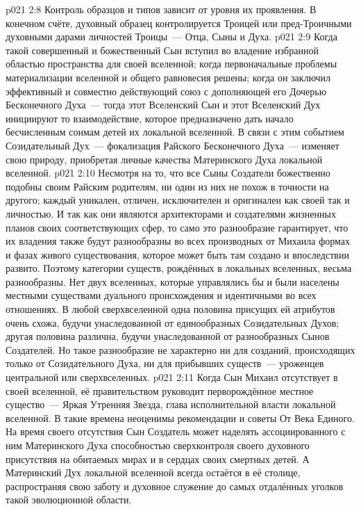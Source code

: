 \vs p021 2:8 \pc Контроль образцов и типов  зависит от уровня их проявления. В конечном счёте, духовный образец контролируется Троицей или пред\hyp{}Троичными духовными дарами личностей Троицы~--- Отца, Сыны и Духа.
\vs p021 2:9 \pc Когда такой совершенный и божественный Сын вступил во владение избранной областью пространства для своей вселенной; когда первоначальные проблемы материализации вселенной и общего равновесия решены; когда он заключил эффективный и совместно действующий союз с дополняющей его Дочерью Бесконечного Духа~--- тогда этот Вселенский Сын и этот Вселенский Дух инициируют то взаимодействие, которое предназначено дать начало бесчисленным сонмам детей их локальной вселенной. В связи с этим событием Созидательный Дух~--- фокализация Райского Бесконечного Духа~--- изменяет свою природу, приобретая личные качества Материнского Духа локальной вселенной.
\vs p021 2:10 Несмотря на то, что все Сыны Создатели божественно подобны своим Райским родителям, ни один из них не похож в точности на другого; каждый уникален, отличен, исключителен и оригинален как своей  так и личностью. И так как они являются архитекторами и создателями жизненных планов своих соответствующих сфер, то само это разнообразие гарантирует, что их владения также будут разнообразны во всех производных от Михаила формах и фазах живого существования, которое может быть там создано и впоследствии развито. Поэтому категории существ, рождённых в локальных вселенных, весьма разнообразны. Нет двух вселенных, которые управлялись бы и были населены местными существами дуального происхождения и идентичными во всех отношениях. В любой сверхвселенной одна половина присущих ей атрибутов очень схожа, будучи унаследованной от единообразных Созидательных Духов; другая половина различна, будучи унаследованной от разнообразных Сынов Создателей. Но такое разнообразие не характерно ни для созданий, происходящих только от Созидательного Духа, ни для прибывших существ~--- уроженцев центральной или сверхвселенных.
\vs p021 2:11 \pc Когда Сын Михаил отсутствует в своей вселенной, её правительством руководит перворождённое местное существо~--- Яркая Утренняя Звезда, глава исполнительной власти локальной вселенной. В такие времена неоценимы рекомендации и советы От Века Единого. На время своего отсутствия Сын Создатель может наделять ассоциированного с ним Материнского Духа способностью сверхконтроля своего духовного присутствия на обитаемых мирах и в сердцах своих смертных детей. А Материнский Дух локальной вселенной всегда остаётся в её столице, распространяя свою заботу и духовное служение до самых отдалённых уголков такой эволюционной области.
